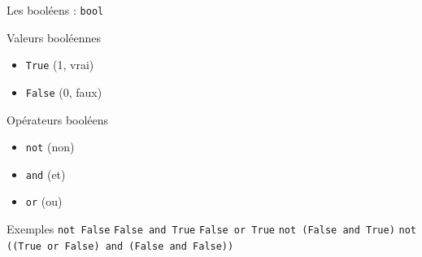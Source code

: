 \documentclass{beamer}
\begin{document}
\begin{frame}{Les booléens : \texttt{bool}}

  \begin{block}{Valeurs booléennes}
    \vspace{0pt}
      \begin{itemize}
        \item \texttt{True} (1, vrai)
        \item \texttt{False} (0, faux)
      \end{itemize}
  \end{block}

  \begin{block}{Opérateurs booléens}
    \vspace{0pt}
      \begin{itemize}
        \item \texttt{not} (non)
        \item \texttt{and} (et)
        \item \texttt{or} (ou)
      \end{itemize}
  \end{block}

  \begin{exampleblock}{Exemples}
    \vspace{0pt}
    \texttt{not False}
    \qquad \texttt{False and True}
    \qquad \texttt{False or True}
    \qquad \texttt{not (False and True)}
    \qquad \texttt{not ((True or False) and (False and False))}
  \end{exampleblock}
\end{frame}
\end{document}
